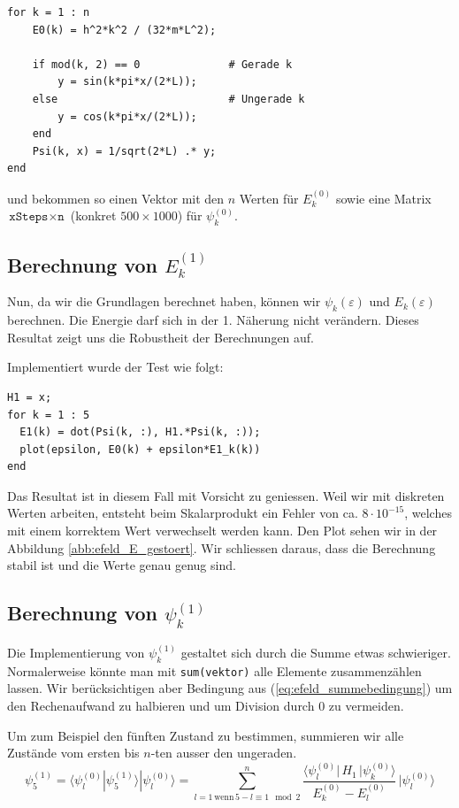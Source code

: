 \begin{refsection}
\begin{lstlisting}[style=Matlab]
for k = 1 : n
    E0(k) = h^2*k^2 / (32*m*L^2);
    
    if mod(k, 2) == 0              # Gerade k
        y = sin(k*pi*x/(2*L));
    else                           # Ungerade k
        y = cos(k*pi*x/(2*L));
    end
    Psi(k, x) = 1/sqrt(2*L) .* y;
end
\end{lstlisting}
und bekommen so einen Vektor mit den $n$ Werten f\"ur $E_k^{(0)}$
sowie eine Matrix $\texttt{xSteps} \times \texttt{n}$ (konkret $500 \times 1000$) f\"ur $\psi_k^{(0)}$.

\subsection{Berechnung von $E_k^{(1)}$}

Nun, da wir die Grundlagen berechnet haben, k\"onnen wir $\psi_k(\varepsilon)$ und 
$E_k(\varepsilon)$ berechnen. Die Energie darf sich in der 1. N\"aherung nicht ver\"andern.
Dieses Resultat zeigt uns die Robustheit der Berechnungen auf.

Implementiert wurde der Test wie folgt:
\begin{lstlisting}[style=Matlab]
H1 = x;
for k = 1 : 5
  E1(k) = dot(Psi(k, :), H1.*Psi(k, :));
  plot(epsilon, E0(k) + epsilon*E1_k(k))
end
\end{lstlisting}
Das Resultat ist in diesem Fall mit Vorsicht zu geniessen.
Weil wir mit diskreten Werten arbeiten, entsteht beim Skalarprodukt ein Fehler von ca. $8 \cdot 10^{-15}$,
welches mit einem korrektem Wert verwechselt werden kann.
Den Plot sehen wir in der Abbildung \ref{abb:efeld_E_gestoert}.
Wir schliessen daraus, dass die Berechnung stabil ist und die Werte genau genug sind.





\subsection{Berechnung von $\psi_k^{(1)}$}

Die Implementierung von $\psi_k^{(1)}$ gestaltet sich durch die Summe etwas schwieriger.
Normalerweise k\"onnte man mit \verb|sum(vektor)| alle Elemente zusammenz\"ahlen lassen.
Wir ber\"ucksichtigen aber Bedingung aus (\ref{eq:efeld_summebedingung}) um den Rechenaufwand zu halbieren
und um Division durch $0$ zu vermeiden.

Um zum Beispiel den f\"unften Zustand zu bestimmen, summieren wir alle Zust\"ande vom 
ersten bis $n$-ten ausser den ungeraden.
\begin{equation}
  \psi_5^{(1)} = \langle\psi_l^{(0)}|\psi_5^{(1)}\rangle|\psi_l^{(0)}\rangle = 
  \sum_{l=1 \, \text{wenn} \, 5-l \equiv 1 \mod 2}^{n}
    \frac{\langle \psi_l^{(0)}|\, H_1 \,|\psi_k^{(0)}\rangle}{E_k^{(0)}-E_l^{(0)}}
        \,
    |\psi_l^{(0)}\rangle
\end{equation}


\end{refsection}

